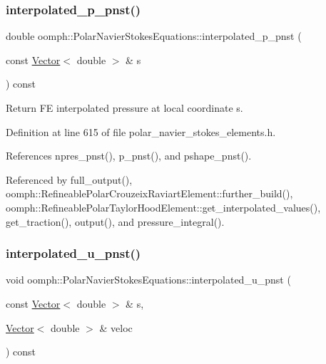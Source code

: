 \subsubsection{\texorpdfstring{interpolated\+\_\+p\+\_\+pnst()}{interpolated\_p\_pnst()}}
{\footnotesize\ttfamily double oomph\+::\+Polar\+Navier\+Stokes\+Equations\+::interpolated\+\_\+p\+\_\+pnst (\begin{DoxyParamCaption}\item[{const \hyperlink{classoomph_1_1Vector}{Vector}$<$ double $>$ \&}]{s }\end{DoxyParamCaption}) const\hspace{0.3cm}{\ttfamily [inline]}}



Return FE interpolated pressure at local coordinate s. 



Definition at line 615 of file polar\+\_\+navier\+\_\+stokes\+\_\+elements.\+h.



References npres\+\_\+pnst(), p\+\_\+pnst(), and pshape\+\_\+pnst().



Referenced by full\+\_\+output(), oomph\+::\+Refineable\+Polar\+Crouzeix\+Raviart\+Element\+::further\+\_\+build(), oomph\+::\+Refineable\+Polar\+Taylor\+Hood\+Element\+::get\+\_\+interpolated\+\_\+values(), get\+\_\+traction(), output(), and pressure\+\_\+integral().

\mbox{\label{classoomph_1_1PolarNavierStokesEquations_ac3a3e89734b01c9f117520eac5a2ace3}} 
\subsubsection{\texorpdfstring{interpolated\+\_\+u\+\_\+pnst()}{interpolated\_u\_pnst()}\hspace{0.1cm}{\footnotesize\ttfamily [1/2]}}
{\footnotesize\ttfamily void oomph\+::\+Polar\+Navier\+Stokes\+Equations\+::interpolated\+\_\+u\+\_\+pnst (\begin{DoxyParamCaption}\item[{const \hyperlink{classoomph_1_1Vector}{Vector}$<$ double $>$ \&}]{s,  }\item[{\hyperlink{classoomph_1_1Vector}{Vector}$<$ double $>$ \&}]{veloc }\end{DoxyParamCaption}) const\hspace{0.3cm}{\ttfamily [inline]}}



